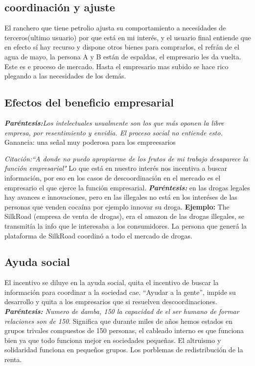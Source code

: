\subsection{coordinación y ajuste}
El ranchero que tiene petrolio ajusta su comportamiento a necesidades de terceros(ultimo usuario) por que está en mi interés, y el usuario final entiende que en efecto sí hay recurso y dispone otros bienes para comprarlos, el refrán de el agua de mayo, la persona A y B están de espaldas, el empresario les da vuelta. Este es e proceso de mercado. Hasta el empresario mas subido se hace rico plegando a las necesidades de los demás.

\subsection{Efectos del beneficio empresarial}
\emph{\textbf{Paréntesis:}Los intelectuales usualmente son los que más oponen la libre empresa, por resentimiento y envidia. El proceso social no entiende esto.} \newline 
\newline 
Ganancia: una señal muy poderosa para los empreesarios 
\newline 

\emph{Citación:``A donde no puedo apropiarme de los frutos de mi trabajo desaparece la función empresarial"} \newline 
Lo que está en nuestro interés nos incentiva a buscar información, por eso en los casos de descoordinación en el mercado es el empresario el que ejerce la función empresarial. \newline 
\emph{\textbf{Paréntesis:}} en las drogas legales hay avances e innovaciones, pero en las illegales no está en los interéses de las personas que venden cocaína por ejemplo innovar su droga.
\textbf{Ejemplo: } The SilkRoad (empresa de venta de drogas), era el amazon de las drogas illegales, se transmitía la info que le interesaba a los consumidores. La persona que generá la plataforma de SilkRoad coordinó a todo el mercado de drogas.



\subsection{Ayuda social}
El incentivo se diluye en la ayuda social, quita el incentivo de buscar la información para coordinar a la sociedad cae. ``Ayudar a la gente'', impide su desarrollo y quita a los empresarios que si resuelven descoordinaciones.
\emph{\textbf{Paréntesis:} Numero de damba, 150 la capacidad de el ser humano de formar relaciones son de 150}. Significa que durante miles de años hemos estados en grupos trivales compuestos de 150 personas, el cableado interno es que funciona bien ya que todo funciona mejor en sociedades pequeñas. El altruismo y solidaridad funciona en pequeños grupos.
\newline 
Los porblemas de redistribución de la renta.

